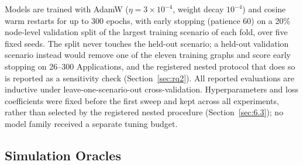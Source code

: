 \documentclass[preprint,3p]{elsarticle}
\begin{document}
Models are trained with AdamW ($\eta = 3 \times 10^{-4}$, weight decay $10^{-4}$) and cosine warm restarts for up to 300 epochs, with early stopping (patience 60) on a 20\% node-level validation split of the largest training scenario of each fold, over five fixed seeds. The split never touches the held-out scenario; a held-out validation scenario instead would remove one of the eleven training graphs and score early stopping on 26--300 Applications, and the registered nested protocol that does so is reported as a sensitivity check (Section~\ref{sec:rq2}). All reported evaluations are inductive under leave-one-scenario-out cross-validation. Hyperparameters and loss coefficients were fixed before the first sweep and kept across all experiments, rather than selected by the registered nested procedure (Section~\ref{sec:6.3}); no model family received a separate tuning budget.

\subsection{Simulation Oracles}
\label{sec:4.3}
\end{document}

